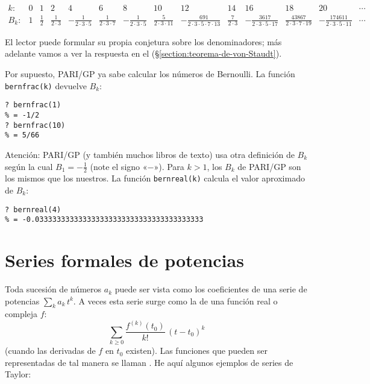 \documentclass{article}
\numberwithin{equation}{section}
\theoremstyle{definition}
\begin{document}
{\def\arraystretch{1.25}
\[ \begin{array}{rccccccccccccccc}
k\colon & 0 & 1 & 2 & 4 & 6 & 8 & 10 & 12 & 14 & 16 & 18 & 20 & \cdots \\
\hline
B_k\colon & 1 & \frac{1}{2} & \frac{1}{2\cdot 3} & -\frac{1}{2\cdot 3\cdot 5} & \frac{1}{2\cdot 3\cdot 7} & -\frac{1}{2\cdot 3\cdot 5} & \frac{5}{2\cdot 3\cdot 11} & -\frac{691}{2\cdot 3\cdot 5\cdot 7\cdot 13} & \frac{7}{2\cdot 3} & -\frac{3617}{2\cdot 3\cdot 5\cdot 17} & \frac{43867}{2\cdot 3\cdot 7\cdot 19} & -\frac{174611}{2\cdot 3\cdot 5\cdot 11} & \cdots
\end{array} \]
}

El lector puede formular su propia conjetura sobre los denominadores; más
adelante vamos a ver la respuesta en el 
(\S\ref{section:teorema-de-von-Staudt}).

\begin{shaded}
  \small\noindent Por supuesto, PARI/GP ya sabe calcular los números de
  Bernoulli. La función \verb|bernfrac(k)| devuelve $B_k$:

\begin{verbatim}
? bernfrac(1)
% = -1/2
? bernfrac(10)
% = 5/66
\end{verbatim}

  \noindent Atención: PARI/GP (y también muchos libros de texto) usa otra
  definición de $B_k$ según la cual $B_1 = -\frac{1}{2}$
  (note el signo «$-$»). Para $k > 1$, los $B_k$ de PARI/GP son los mismos que
  los nuestros. La función \verb|bernreal(k)| calcula el valor aproximado de
  $B_k$:

\begin{verbatim}
? bernreal(4)   
% = -0.033333333333333333333333333333333333333
\end{verbatim}
\end{shaded}


\section{Series formales de potencias}

Toda sucesión de números $a_k$ puede ser vista como los coeficientes de una
serie de potencias $\sum_k a_k\,t^k$. A veces esta serie surge como
la  de una función real o compleja $f$:
$$\sum_{k\ge 0} \frac{f^{(k)} (t_0)}{k!} \, (t-t_0)^k$$
(cuando las derivadas de $f$ en $t_0$ existen). Las funciones que pueden ser
representadas de tal manera se llaman . He aquí algunos
ejemplos de series de Taylor:
\end{document}
